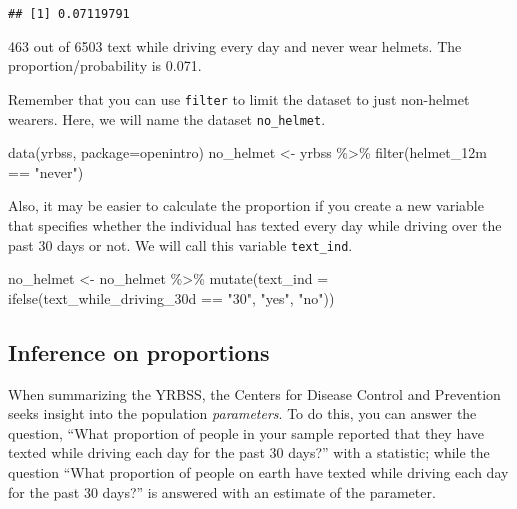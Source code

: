 \documentclass[
]{article}
\newenvironment{Shaded}{\begin{snugshade}}{\end{snugshade}}
\newcommand{\AttributeTok}[1]{\textcolor[rgb]{0.77,0.63,0.00}{#1}}
\newcommand{\FunctionTok}[1]{\textcolor[rgb]{0.00,0.00,0.00}{#1}}
\newcommand{\NormalTok}[1]{#1}
\newcommand{\OtherTok}[1]{\textcolor[rgb]{0.56,0.35,0.01}{#1}}
\newcommand{\SpecialCharTok}[1]{\textcolor[rgb]{0.00,0.00,0.00}{#1}}
\newcommand{\StringTok}[1]{\textcolor[rgb]{0.31,0.60,0.02}{#1}}
\begin{document}
\begin{verbatim}
## [1] 0.07119791
\end{verbatim}

463 out of 6503 text while driving every day and never wear helmets. The
proportion/probability is 0.071.

Remember that you can use \texttt{filter} to limit the dataset to just
non-helmet wearers. Here, we will name the dataset \texttt{no\_helmet}.

\begin{Shaded}
\begin{Highlighting}[]
\FunctionTok{data}\NormalTok{(}\StringTok{\textquotesingle{}yrbss\textquotesingle{}}\NormalTok{, }\AttributeTok{package=}\StringTok{\textquotesingle{}openintro\textquotesingle{}}\NormalTok{)}
\NormalTok{no\_helmet }\OtherTok{\textless{}{-}}\NormalTok{ yrbss }\SpecialCharTok{\%\textgreater{}\%}
  \FunctionTok{filter}\NormalTok{(helmet\_12m }\SpecialCharTok{==} \StringTok{"never"}\NormalTok{)}
\end{Highlighting}
\end{Shaded}

Also, it may be easier to calculate the proportion if you create a new
variable that specifies whether the individual has texted every day
while driving over the past 30 days or not. We will call this variable
\texttt{text\_ind}.

\begin{Shaded}
\begin{Highlighting}[]
\NormalTok{no\_helmet }\OtherTok{\textless{}{-}}\NormalTok{ no\_helmet }\SpecialCharTok{\%\textgreater{}\%}
  \FunctionTok{mutate}\NormalTok{(}\AttributeTok{text\_ind =} \FunctionTok{ifelse}\NormalTok{(text\_while\_driving\_30d }\SpecialCharTok{==} \StringTok{"30"}\NormalTok{, }\StringTok{"yes"}\NormalTok{, }\StringTok{"no"}\NormalTok{))}
\end{Highlighting}
\end{Shaded}

\hypertarget{inference-on-proportions}{%
\subsection{Inference on proportions}\label{inference-on-proportions}}

When summarizing the YRBSS, the Centers for Disease Control and
Prevention seeks insight into the population \emph{parameters}. To do
this, you can answer the question, ``What proportion of people in your
sample reported that they have texted while driving each day for the
past 30 days?'' with a statistic; while the question ``What proportion
of people on earth have texted while driving each day for the past 30
days?'' is answered with an estimate of the parameter.
\end{document}
